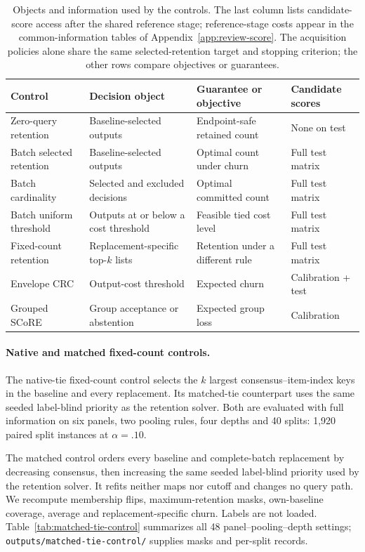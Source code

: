 \begin{table}[t]
\centering\small\setlength{\tabcolsep}{3pt}
\begin{tabular}{llll}
\toprule
Control & Decision object & Guarantee or objective & Candidate scores\\
\midrule
Zero-query retention & Baseline-selected outputs & Endpoint-safe retained count & None on test\\
Batch selected retention & Baseline-selected outputs & Optimal count under churn & Full test matrix\\
Batch cardinality & Selected and excluded decisions & Optimal committed count & Full test matrix\\
Batch uniform threshold & Outputs at or below a cost threshold & Feasible tied cost level & Full test matrix\\
Fixed-count retention & Replacement-specific top-$k$ lists & Retention under a different rule & Full test matrix\\
Envelope CRC & Output-cost threshold & Expected churn & Calibration + test\\
Grouped SCoRE & Group acceptance or abstention & Expected group loss & Calibration\\
\bottomrule
\end{tabular}
\caption{Objects and information used by the controls. The last column lists candidate-score access after the shared reference stage; reference-stage costs appear in the common-information tables of Appendix~\ref{app:review-score}. The acquisition policies alone share the same selected-retention target and stopping criterion; the other rows compare objectives or guarantees.}
\label{tab:control-objects}
\end{table}

\paragraph{Native and matched fixed-count controls.}
The native-tie fixed-count control selects the $k$ largest consensus--item-index keys in the baseline and every replacement. Its matched-tie counterpart uses the same seeded label-blind priority as the retention solver. Both are evaluated with full information on six panels, two pooling rules, four depths and 40 splits: 1,920 paired split instances at $\alpha=.10$.

The matched control orders every baseline and complete-batch replacement by decreasing consensus, then increasing the same seeded label-blind priority used by the retention solver. It refits neither maps nor cutoff and changes no query path. We recompute membership flips, maximum-retention masks, own-baseline coverage, average and replacement-specific churn. Labels are not loaded. Table~\ref{tab:matched-tie-control} summarizes all 48 panel--pooling--depth settings; \nolinkurl{outputs/matched-tie-control/} supplies masks and per-split records.

